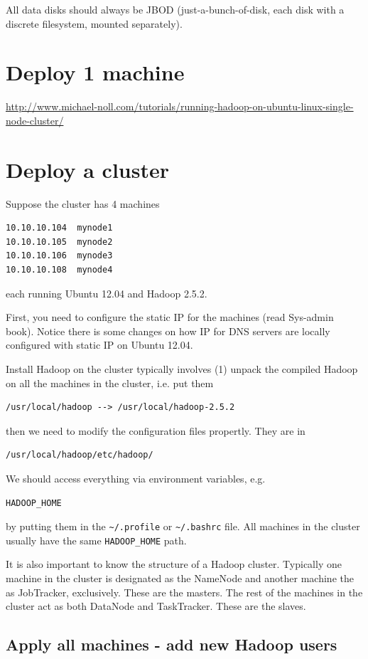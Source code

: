 All data disks should always be JBOD (just-a-bunch-of-disk, each disk
with a discrete filesystem, mounted separately).


\section{Deploy 1 machine}

\url{http://www.michael-noll.com/tutorials/running-hadoop-on-ubuntu-linux-single-node-cluster/}


\section{Deploy a cluster}

Suppose the cluster has 4 machines
\begin{verbatim}
10.10.10.104  mynode1
10.10.10.105  mynode2
10.10.10.106  mynode3
10.10.10.108  mynode4
\end{verbatim}
each running Ubuntu 12.04 and Hadoop 2.5.2.

First, you need to configure the static IP for the machines (read Sys-admin
book). Notice there is some changes on how IP for DNS servers are locally
configured with static IP on Ubuntu 12.04.


Install Hadoop on the cluster typically involves (1) unpack the compiled Hadoop
on all the machines in the cluster, i.e. put them 
\begin{verbatim}
/usr/local/hadoop --> /usr/local/hadoop-2.5.2
\end{verbatim}
then we need to modify the configuration files propertly. They are in 
\begin{verbatim}
/usr/local/hadoop/etc/hadoop/
\end{verbatim}
We should access everything via environment variables, e.g.
\begin{verbatim}
HADOOP_HOME
\end{verbatim}
by putting them in the \verb!~/.profile! or \verb!~/.bashrc! file.
All machines in the cluster usually have the same \verb!HADOOP_HOME! path.

It is also important to know the structure of a Hadoop cluster. 
Typically one machine in the cluster is designated as the NameNode and another
machine the as JobTracker, exclusively. These are the masters. The rest of the
machines in the cluster act as both DataNode and TaskTracker. These are the slaves. 


\subsection{Apply all machines - add new Hadoop users}

